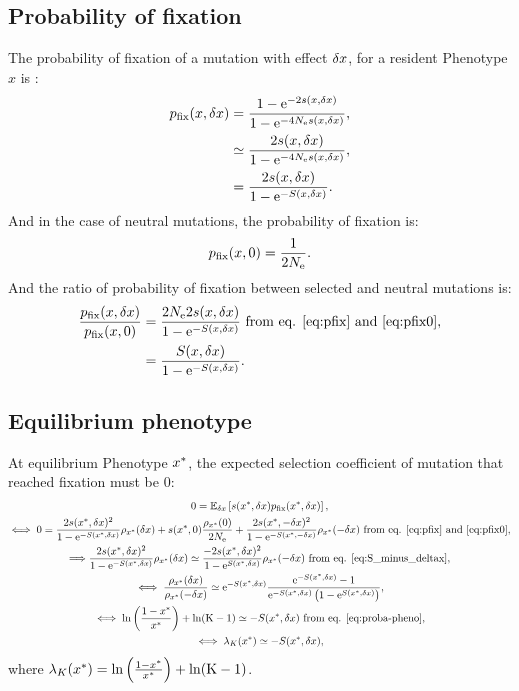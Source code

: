 \subsection{Probability of fixation}
The probability of fixation of a mutation with effect $\delta x$, for a resident \gls{Phenotype} $x$ is :
\begin{align}
p_{\text{fix}}(x, \delta x) &= \frac{ 1 - \mathrm{e}^{-2 s(x, \delta x)}}{1 - \mathrm{e}^{-4N_{\mathrm{e}} s(x, \delta x)}}, \\
 &\simeq \frac{ 2 s(x, \delta x)}{1 - \mathrm{e}^{-4N_{\mathrm{e}} s(x, \delta x)}}, \\
 &= \frac{ 2 s(x, \delta x)}{1 - \mathrm{e}^{-S(x, \delta x)}}. \label{eq:pfix}
\end{align}
And in the case of \gls{neutral} mutations, the probability of fixation is:
\begin{gather}
p_{\text{fix}}(x, 0) = \frac{ 1}{2 N_{\mathrm{e}}} \label{eq:pfix0}.
\end{gather}
And the ratio of probability of fixation between selected and \gls{neutral} mutations is:
\begin{align}
\frac{p_{\text{fix}}(x, \delta x)}{p_{\text{fix}}(x, 0)} & = \frac{ 2 N_{\mathrm{e}} 2 s(x, \delta x)}{1 - \mathrm{e}^{-S(x, \delta x)}} \text{ from eq. \ref{eq:pfix} and \ref{eq:pfix0}},\\
& = \frac{S(x, \delta x)}{1 - \mathrm{e}^{-S(x, \delta x)}} \label{eq:pfixratio}.
\end{align}
\subsection{Equilibrium phenotype}
At equilibrium \gls{Phenotype} $x^{*}$, the expected selection coefficient of mutation that reached fixation must be $0$:
\begin{gather}
 0 = \operatorname{\mathbb{E}}_{\delta x} \left[ s(x^{*}, \delta x) p_{\text{fix}}(x^{*}, \delta x) \right], \\
\iff 0 = \frac{ 2 s(x^{*}, \delta x)^2}{1 - \mathrm{e}^{-S(x^{*}, \delta x)}}   \rho_{x^{*}}(\delta x) + s(x^{*}, 0) \frac{ \rho_{x^{*}}(0)}{2N_{\mathrm{e}}} + \frac{ 2s(x^{*}, -\delta x)^2}{1 - \mathrm{e}^{-S(x^{*}, -\delta x)}} \rho_{x^{*}}(-\delta x)\text{ from eq. \ref{eq:pfix} and \ref{eq:pfix0}}, \\
\Longrightarrow \frac{ 2s(x^{*}, \delta x)^2}{1 - \mathrm{e}^{-S(x^{*}, \delta x)}}   \rho_{x^{*}}(\delta x) \simeq \frac{ - 2s(x^{*}, \delta x)^2}{1 - \mathrm{e}^{S(x^{*}, \delta x)}}   \rho_{x^{*}}(-\delta x) \text{ from eq. \ref{eq:S_minus_deltax}}, \\
\iff \frac{ \rho_{x^{*}}(\delta x)}{\rho_{x^{*}}(-\delta x)} \simeq \mathrm{e}^{-S(x^{*}, \delta x)} \frac{ \mathrm{e}^{-S(x^{*}, \delta x)} - 1}{ \mathrm{e}^{-S(x^{*}, \delta x)} \left( 1 - \mathrm{e}^{S(x^{*}, \delta x)} \right)}, \\
\iff \ln \left( \frac{1 - x^{*}}{x^{*}} \right) + \ln (\text{K}-1) \simeq -S(x^{*}, \delta x) \text{ from eq. \ref{eq:proba-pheno}} \label{eq:equilibrium-pheno}, \\
\iff \lambda_{K}(x^{*}) \simeq -S(x^{*}, \delta x) \label{eq:equilibrium_lambda},
\end{gather}
where  $\lambda_{K}(x^{*}) = \ln \left( \frac{1 - x^{*}}{x^{*}} \right) + \ln (\text{K}-1)$.
